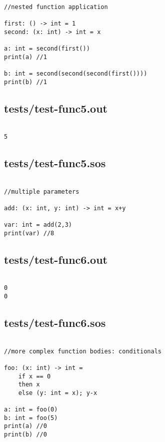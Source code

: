 \documentclass[main.tex]{subfiles}
\begin{document}
\begin{lstlisting}

//nested function application

first: () -> int = 1
second: (x: int) -> int = x

a: int = second(first())
print(a) //1

b: int = second(second(second(first())))
print(b) //1
\end{lstlisting}

\subsection{tests/test-func5.out}

\begin{lstlisting}

5
\end{lstlisting}

\subsection{tests/test-func5.sos}

\begin{lstlisting}

//multiple parameters

add: (x: int, y: int) -> int = x+y

var: int = add(2,3)
print(var) //8
\end{lstlisting}

\subsection{tests/test-func6.out}

\begin{lstlisting}

0
0
\end{lstlisting}

\subsection{tests/test-func6.sos}

\begin{lstlisting}

//more complex function bodies: conditionals

foo: (x: int) -> int = 
    if x == 0
    then x
    else (y: int = x); y-x

a: int = foo(0)
b: int = foo(5)
print(a) //0
print(b) //0
\end{lstlisting}
\end{document}
